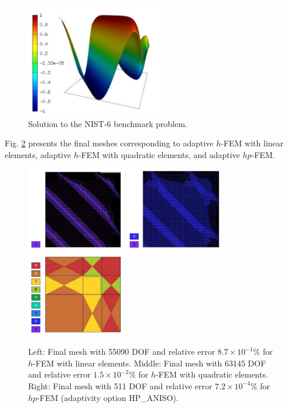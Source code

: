 \documentclass[12pt]{elsarticle}
\begin{document}
\begin{figure}[H]
\centering
\vspace{-3mm}
\includegraphics[height=5cm]{mafig35.pdf}
\caption{Solution to the NIST-6 benchmark problem.}
\vspace{-3mm}
\label{fig:sln-nist06}
\end{figure}

Fig. \ref{fig:nist-6-hp-aniso} presents the final meshes corresponding to adaptive $h$-FEM with
linear elements, adaptive $h$-FEM with quadratic elements, and adaptive $hp$-FEM.

\begin{figure}[H]
\centering
\includegraphics[height=3.7cm]{mafig36.pdf}
\includegraphics[height=3.7cm]{mafig37.pdf}
\includegraphics[height=3.7cm]{mafig38.pdf}
\caption{
Left: Final mesh with 55090 DOF and relative error $8.7\times10^{-1}$\% for $h$-FEM with linear elements.
Middle: Final mesh with 63145 DOF and relative error $1.5\times10^{-2}$\% for $h$-FEM with quadratic elements.
Right: Final mesh with 511 DOF and relative error $7.2\times10^{-4}$\% for $hp$-FEM (adaptivity option HP\_ANISO).}
\vspace{-2mm}
\label{fig:nist-6-hp-aniso}
\end{figure}
\end{document}
